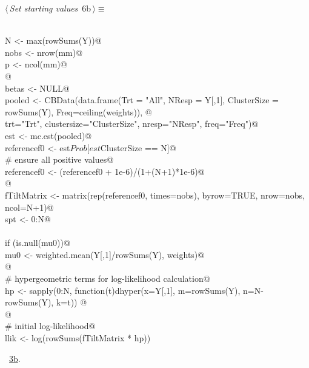 \documentclass[reqno]{amsart}
\renewcommand{\NWtarget}[2]{\hypertarget{#1}{#2}}
\renewcommand{\NWlink}[2]{\hyperlink{#1}{#2}}
\begin{document}
\begin{flushleft} \small\label{scrap8}\raggedright\small
\NWtarget{nuweb6b}{} $\langle\,${\itshape Set starting values}\nobreak\ {\footnotesize {6b}}$\,\rangle\equiv$
\vspace{-1ex}
\begin{list}{}{} \item
\mbox{}\verb@@\\
\mbox{}\verb@  N <- max(rowSums(Y))@\\
\mbox{}\verb@  nobs <- nrow(mm)@\\
\mbox{}\verb@  p <- ncol(mm)@\\
\mbox{}\verb@  @\\
\mbox{}\verb@  betas <- NULL@\\
\mbox{}\verb@  pooled <- CBData(data.frame(Trt = "All", NResp = Y[,1], ClusterSize = rowSums(Y), Freq=ceiling(weights)), @\\
\mbox{}\verb@                    trt="Trt", clustersize="ClusterSize", nresp="NResp", freq="Freq")@\\
\mbox{}\verb@  est <- mc.est(pooled)@\\
\mbox{}\verb@  referencef0 <- est$Prob[est$ClusterSize == N]@\\
\mbox{}\verb@  # ensure all positive values@\\
\mbox{}\verb@  referencef0 <- (referencef0 + 1e-6)/(1+(N+1)*1e-6)@\\
\mbox{}\verb@  @\\
\mbox{}\verb@  fTiltMatrix <- matrix(rep(referencef0, times=nobs), byrow=TRUE, nrow=nobs, ncol=N+1)@\\
\mbox{}\verb@  spt <- 0:N@\\
\mbox{}\verb@@\\
\mbox{}\verb@  if (is.null(mu0))@\\
\mbox{}\verb@    mu0 <- weighted.mean(Y[,1]/rowSums(Y), weights)@\\
\mbox{}\verb@  @\\
\mbox{}\verb@  # hypergeometric terms for log-likelihood calculation@\\
\mbox{}\verb@  hp <- sapply(0:N, function(t)dhyper(x=Y[,1], m=rowSums(Y), n=N-rowSums(Y), k=t))   @\\
\mbox{}\verb@  @\\
\mbox{}\verb@  # initial log-likelihood@\\
\mbox{}\verb@  llik <- log(rowSums(fTiltMatrix * hp)) %*% weights@\\
\mbox{}\verb@@\\
\mbox{}\verb@@{\NWsep}
\end{list}
\vspace{-1.5ex}
\footnotesize
\begin{list}{}{\setlength{\itemsep}{-\parsep}\setlength{\itemindent}{-\leftmargin}}
\item \NWtxtMacroRefIn\ \NWlink{nuweb3b}{3b}.

\item{}
\end{list}
\vspace{4ex}
\end{flushleft}
\end{document}
